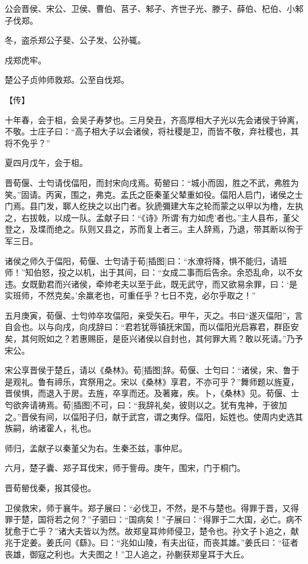\documentclass[a4paper,12pt,UTF8,twoside]{ctexbook}
\begin{document}
公会晋侯、宋公、卫侯、曹伯、莒子、邾子、齐世子光、滕子、薛伯、杞伯、小邾子伐郑。

冬，盗杀郑公子斐、公子发、公孙辄。

戍郑虎牢。

楚公子贞帅师救郑。公至自伐郑。

【传】

十年春，会于柤，会吴子寿梦也。三月癸丑，齐高厚相大子光以先会诸侯于钟离，不敬。士庄子曰：“高子相大子以会诸侯，将社稷是卫，而皆不敬，弃社稷也，其将不免乎？”

夏四月戊午，会于柤。

晋荀偃、士匄请伐偪阳，而封宋向戌焉。荀罃曰：“城小而固，胜之不武，弗胜为笑。”固请。丙寅，围之，弗克。孟氏之臣秦堇父辇重如役。偪阳人启门，诸侯之士门焉。县门发，郰人纥抉之以出门者。狄虒彌建大车之轮而蒙之以甲以为橹，左执之，右拔戟，以成一队。孟献子曰：“《诗》所谓‘有力如虎’者也。”主人县布，堇父登之，及堞而绝之。队则又县之，苏而复上者三。主人辞焉，乃退，带其断以徇于军三日。

诸侯之师久于偪阳，荀偃、士匄请于荀[插图]曰：“水潦将降，惧不能归，请班师！”知伯怒，投之以机，出于其间，曰：“女成二事而后告余。余恐乱命，以不女违。女既勤君而兴诸侯，牵帅老夫以至于此，既无武守，而又欲易余罪，曰：‘是实班师，不然克矣。’余羸老也，可重任乎？七日不克，必尔乎取之！”

五月庚寅，荀偃、士匄帅卒攻偪阳，亲受矢石。甲午，灭之。书曰“遂灭偪阳”，言自会也。以与向戌，向戌辞曰：“君若犹辱镇抚宋国，而以偪阳光启寡君，群臣安矣，其何贶如之？若惠赐臣，是臣兴诸侯以自封也，其何罪大焉？敢以死请。”乃予宋公。

宋公享晋侯于楚丘，请以《桑林》。荀[插图]辞。荀偃、士匄曰：“诸侯，宋、鲁于是观礼。鲁有禘乐，宾祭用之。宋以《桑林》享君，不亦可乎？”舞师题以旌夏，晋侯惧，而退入于房。去旌，卒享而还。及著雍，疾。卜，《桑林》见。荀偃、士匄欲奔请祷焉。荀[插图]不可，曰：“我辞礼矣，彼则以之。犹有鬼神，于彼加之。”晋侯有间，以偪阳子归，献于武宫，谓之夷俘。偪阳，妘姓也。使周内史选其族嗣，纳诸霍人，礼也。

师归，孟献子以秦堇父为右。生秦丕兹，事仲尼。

六月，楚子囊、郑子耳伐宋，师于訾毋。庚午，围宋，门于桐门。

晋荀罃伐秦，报其侵也。

卫侯救宋，师于襄牛。郑子展曰：“必伐卫，不然，是不与楚也。得罪于晋，又得罪于楚，国将若之何？”子驷曰：“国病矣！”子展曰：“得罪于二大国，必亡。病不犹愈于亡乎？”诸大夫皆以为然。故郑皇耳帅师侵卫，楚令也。孙文子卜追之，献兆于定姜。姜氏问《繇》。曰：“兆如山陵，有夫出征，而丧其雄。”姜氏曰：“征者丧雄，御寇之利也。大夫图之！”卫人追之，孙蒯获郑皇耳于大丘。
\end{document}
